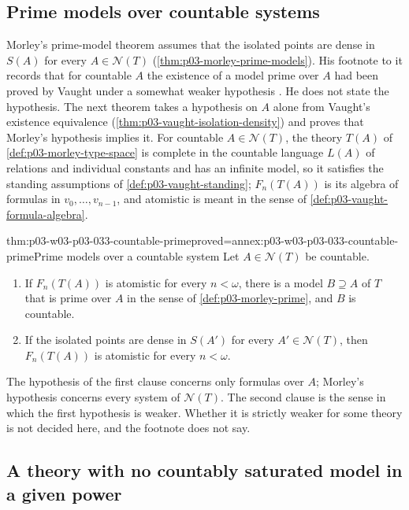 \subsection{Prime models over countable systems}
\label{sec:p03-w03-p03-033-countable-prime}

Morley's prime-model theorem assumes that the isolated points are dense in
\(S(A)\) for every \(A\in\mathcal N(T)\)
(\cref{thm:p03-morley-prime-models}). His footnote to it records that for
countable \(A\) the existence of a model prime over \(A\) had been proved
by Vaught under a somewhat weaker hypothesis
\cite[p.~530, n.~20]{Morley1965}. He does not state the hypothesis. The
next theorem takes a hypothesis on \(A\) alone from Vaught's existence
equivalence (\cref{thm:p03-vaught-isolation-density}) and proves that
Morley's hypothesis implies it. For countable \(A\in\mathcal N(T)\), the
theory \(T(A)\) of \cref{def:p03-morley-type-space} is complete in the
countable language \(L(A)\) of relations and individual constants and has
an infinite model, so it satisfies the standing assumptions of
\cref{def:p03-vaught-standing}; \(F_n(T(A))\) is its algebra of formulas
in \(v_0,\dots,v_{n-1}\), and atomistic is meant in the sense of
\cref{def:p03-vaught-formula-algebra}.

\begin{hbtheorem}{thm:p03-w03-p03-033-countable-prime}{proved=annex:p03-w03-p03-033-countable-prime}{Prime models over a countable system}
Let \(A\in\mathcal N(T)\) be countable.
\begin{enumerate}
\item If \(F_n(T(A))\) is atomistic for every \(n<\omega\), there is a
model \(B\supseteq A\) of \(T\) that is prime over \(A\) in the sense of
\cref{def:p03-morley-prime}, and \(B\) is countable.
\item If the isolated points are dense in \(S(A')\) for every
\(A'\in\mathcal N(T)\), then \(F_n(T(A))\) is atomistic for every
\(n<\omega\).
\end{enumerate}
\end{hbtheorem}

The hypothesis of the first clause concerns only formulas over \(A\);
Morley's hypothesis concerns every system of \(\mathcal N(T)\). The second
clause is the sense in which the first hypothesis is weaker. Whether it is
strictly weaker for some theory is not decided here, and the footnote does
not say.

\subsection{A theory with no countably saturated model in a given power}
\label{sec:p03-w03-p03-033-coding-example}

